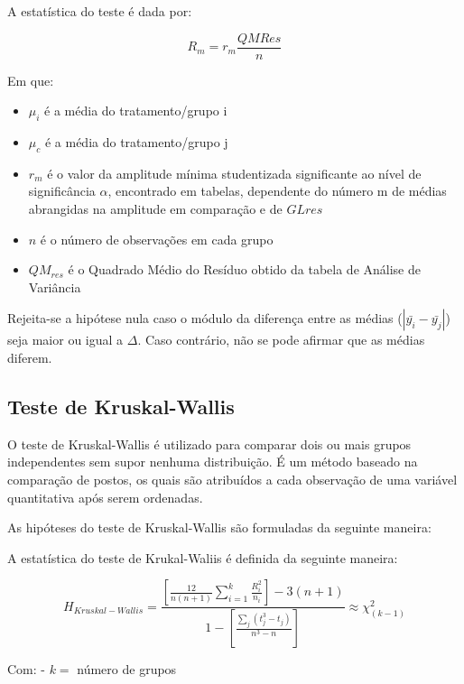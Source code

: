 \documentclass[
]{estat/estat}
\begin{document}

A estatística do teste é dada por:

\[R_m = r_m \frac{QMRes}{n}\]

Em que:

\begin{itemize}
\item
  \(\mu_i\) é a média do tratamento/grupo i
\item
  \(\mu_c\) é a média do tratamento/grupo j
\item
  \(r_m\) é o valor da amplitude mínima studentizada significante ao
  nível de significância \(\alpha\), encontrado em tabelas, dependente
  do número m de médias abrangidas na amplitude em comparação e de
  \(GLres\)
\item
  \(n\) é o número de observações em cada grupo
\item
  \(QM_{res}\) é o Quadrado Médio do Resíduo obtido da tabela de Análise
  de Variância
\end{itemize}

Rejeita-se a hipótese nula caso o módulo da diferença entre as médias
(\(|\bar{y_i} - \bar{y_j}|\)) seja maior ou igual a \(\Delta\). Caso
contrário, não se pode afirmar que as médias diferem.

\subsection{Teste de Kruskal-Wallis}\label{teste-de-kruskal-wallis}

O teste de Kruskal-Wallis é utilizado para comparar dois ou mais grupos
independentes sem supor nenhuma distribuição. É um método baseado na
comparação de postos, os quais são atribuídos a cada observação de uma
variável quantitativa após serem ordenadas.

As hipóteses do teste de Kruskal-Wallis são formuladas da seguinte
maneira:


A estatística do teste de Krukal-Waliis é definida da seguinte maneira:

\[
H_{Kruskal-Wallis}=
    \displaystyle\frac{\displaystyle\left[ \frac{12}{n(n+1)} \sum_{i=1}^{k} \frac{R_i^2}{n_i} \right] - 3(n+1)}
    {\displaystyle1- \left[ \frac{\displaystyle\sum_{j}^{}(t_j^3 - t_j)}{n^3 - n}\right]} 
\approx \chi^2_{(k-1)}
\]

Com: - \(k=\) número de grupos
\end{document}
